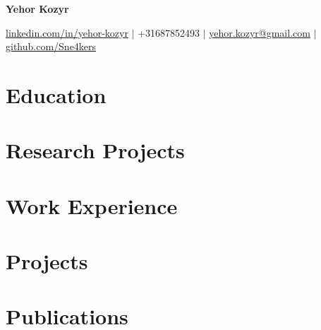\documentclass[a4paper,21pt]{article}
\begin{document}
\begin{center} \textbf{\LARGE{Yehor Kozyr}} \end{center}
\vspace{-12pt}
\begin{center}
\href{https://www.linkedin.com/in/yehor-kozyr/}{linkedin.com/in/yehor-kozyr} $\vert$ +31687852493 $\vert$ \href{mailto:yehor.kozyr@gmail.com}{yehor.kozyr@gmail.com} $\vert$ \href{https://github.com/Sne4kers}{github.com/Sne4kers} \end{center}


\section{Education}
  \resumeSubHeadingListStart
    
    
\resumeSubHeadingListEnd

\vspace{-10pt}
\section{Research Projects}
\resumeSubHeadingListStart
    
    
\resumeSubHeadingListEnd



\vspace{-8pt}
\section{Work Experience}
  \resumeSubHeadingListStart
    
    
  \resumeSubHeadingListEnd
\vspace{-6pt}
\section{Projects}
\resumeSubHeadingListStart
  
  
\resumeSubHeadingListEnd

\vspace{-5pt}
\section{Publications}

\end{document}

